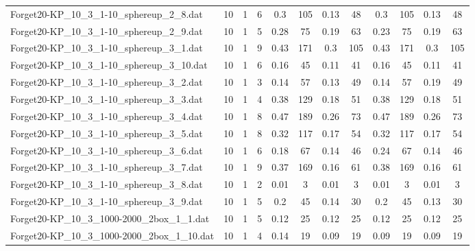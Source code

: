 \begin{sidewaystable}[!ht]
{\begin{tabular}{lccccccccccc}
Forget20-KP\_10\_3\_1-10\_sphereup\_2\_8.dat & 10 & 1 & 6 & 0.3 & 105 &  \textcolor{blue2}{0.13} & 48 & 0.3 & 105 &  \textcolor{blue2}{0.13} & 48 \\
Forget20-KP\_10\_3\_1-10\_sphereup\_2\_9.dat & 10 & 1 & 5 & 0.28 & 75 &  \textcolor{blue2}{0.19} & 63 & 0.23 & 75 &  \textcolor{blue2}{0.19} & 63 \\
Forget20-KP\_10\_3\_1-10\_sphereup\_3\_1.dat & 10 & 1 & 9 & 0.43 & 171 &  \textcolor{blue2}{0.3} & 105 & 0.43 & 171 &  \textcolor{blue2}{0.3} & 105 \\
Forget20-KP\_10\_3\_1-10\_sphereup\_3\_10.dat & 10 & 1 & 6 & 0.16 & 45 &  \textcolor{blue2}{0.11} & 41 & 0.16 & 45 &  \textcolor{blue2}{0.11} & 41 \\
Forget20-KP\_10\_3\_1-10\_sphereup\_3\_2.dat & 10 & 1 & 3 & 0.14 & 57 &  \textcolor{blue2}{0.13} & 49 & 0.14 & 57 & 0.19 & 49 \\
Forget20-KP\_10\_3\_1-10\_sphereup\_3\_3.dat & 10 & 1 & 4 & 0.38 & 129 &  \textcolor{blue2}{0.18} & 51 & 0.38 & 129 &  \textcolor{blue2}{0.18} & 51 \\
Forget20-KP\_10\_3\_1-10\_sphereup\_3\_4.dat & 10 & 1 & 8 & 0.47 & 189 &  \textcolor{blue2}{0.26} & 73 & 0.47 & 189 &  \textcolor{blue2}{0.26} & 73 \\
Forget20-KP\_10\_3\_1-10\_sphereup\_3\_5.dat & 10 & 1 & 8 & 0.32 & 117 &  \textcolor{blue2}{0.17} & 54 & 0.32 & 117 &  \textcolor{blue2}{0.17} & 54 \\
Forget20-KP\_10\_3\_1-10\_sphereup\_3\_6.dat & 10 & 1 & 6 & 0.18 & 67 &  \textcolor{blue2}{0.14} & 46 & 0.24 & 67 &  \textcolor{blue2}{0.14} & 46 \\
Forget20-KP\_10\_3\_1-10\_sphereup\_3\_7.dat & 10 & 1 & 9 & 0.37 & 169 &  \textcolor{blue2}{0.16} & 61 & 0.38 & 169 &  \textcolor{blue2}{0.16} & 61 \\
Forget20-KP\_10\_3\_1-10\_sphereup\_3\_8.dat & 10 & 1 & 2 &  \textcolor{blue2}{0.01} & 3 &  \textcolor{blue2}{0.01} & 3 &  \textcolor{blue2}{0.01} & 3 &  \textcolor{blue2}{0.01} & 3 \\
Forget20-KP\_10\_3\_1-10\_sphereup\_3\_9.dat & 10 & 1 & 5 & 0.2 & 45 & 0.14 & 30 & 0.2 & 45 &  \textcolor{blue2}{0.13} & 30 \\
Forget20-KP\_10\_3\_1000-2000\_2box\_1\_1.dat & 10 & 1 & 5 &  \textcolor{blue2}{0.12} & 25 &  \textcolor{blue2}{0.12} & 25 &  \textcolor{blue2}{0.12} & 25 &  \textcolor{blue2}{0.12} & 25 \\
Forget20-KP\_10\_3\_1000-2000\_2box\_1\_10.dat & 10 & 1 & 4 & 0.14 & 19 &  \textcolor{blue2}{0.09} & 19 &  \textcolor{blue2}{0.09} & 19 &  \textcolor{blue2}{0.09} & 19 \\

\end{tabular}}
\end{sidewaystable}
